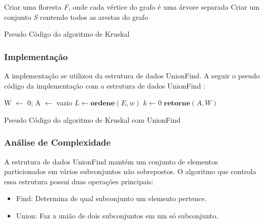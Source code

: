 \documentclass[a4paper,12pt]{article}
\begin{document}
\begin{algorithm}[H]
\SetAlgoLined
{}
Criar uma floresta \emph{F}, onde cada vértice do grafo é uma árvore separada\;
Criar um conjunto \emph{S} contendo todos as arestas do grafo\;
\caption{Pseudo Código do algoritmo de Kruskal}
\end{algorithm}

\subsubsection{Implementação}
A implementação se utilizou da estrutura de dados UnionFind. A seguir o pseudo código da implementação com a estrutura de dados UnionFind :\\
\begin{algorithm}[H]
\LinesNumbered
\SetAlgoLined
{}
W $\gets$ 0; A $\gets$ vazio\;
$L \gets \textbf{ordene}(E ,w )$\;
$k \gets 0$\;
$\textbf{retorne} (A, W)$\;
\caption{Pseudo Código do algoritmo de Kruskal com UnionFind}
\end{algorithm}

\subsubsection{Análise de Complexidade}
A estrutura de dados UnionFind mantém um conjunto de elementos particionados em vários subconjuntos não sobrepostos. O algoritmo que controla essa estrutura possui duas operações principais:
\begin{itemize}
\item Find: Determina de qual subconjunto um elemento pertence.
\item Union: Faz a união de dois subconjuntos em um só subconjunto.
\end{itemize}
\end{document}
